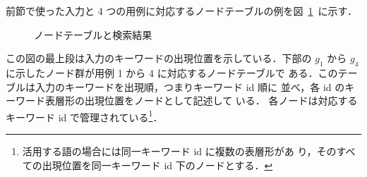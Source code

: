 前節で使った入力と 4 つの用例に対応するノードテーブルの例を図~\ref{fig:dousa}~に示す．
\begin{figure}
\begin{center}
\caption{ノードテーブルと検索結果}
\label{fig:dousa}
\vspace*{-1mm}
\end{center}
\end{figure}

この図の最上段は入力のキーワードの出現位置を示している．下部の $g_1$ 
から $g_4$ に示したノード群が用例 1 から 4 に対応するノードテーブルで
ある．このテーブルは入力のキーワードを出現順，つまりキーワード id 順に
並べ，各 id のキーワード表層形の出現位置をノードとして記述して
いる．
各ノードは対応するキーワード id で管理されている\footnote{活用する語の場合には同一キーワード id に複数の表層形があ
り，そのすべての出現位置を同一キーワード id 下のノードとする．}．

